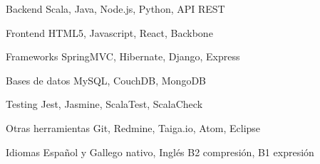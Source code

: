


\begin{cvskills}


\cvskill
{Backend} %
{Scala, Java, Node.js, Python, API REST} %


\cvskill
{Frontend} %
{HTML5, Javascript, React, Backbone} %


\cvskill
{Frameworks} %
{SpringMVC, Hibernate, Django, Express} %


\cvskill
{Bases de datos} %
{MySQL, CouchDB, MongoDB} %


\cvskill
{Testing} %
{Jest, Jasmine, ScalaTest, ScalaCheck} %


\cvskill
{Otras herramientas} %
{Git, Redmine, Taiga.io, Atom, Eclipse} %


\cvskill
{Idiomas} %
{Español y Gallego nativo, Inglés B2 compresión, B1 expresión} %


\end{cvskills}
